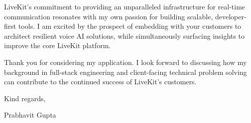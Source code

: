 \documentclass[11pt,a4paper]{article}
\begin{document}
LiveKit's commitment to providing an unparalleled infrastructure for real-time communication resonates with my own passion for building scalable, developer-first tools. I am excited by the prospect of embedding with your customers to architect resilient voice AI solutions, while simultaneously surfacing insights to improve the core LiveKit platform.

Thank you for considering my application. I look forward to discussing how my background in full-stack engineering and client-facing technical problem solving can contribute to the continued success of LiveKit's customers.

\vspace{1em}
Kind regards,

\vspace{1em}
Prabhavit Gupta
\end{document}
